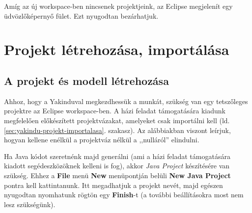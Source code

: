 \begin{comment}
Természetesen máshonnan is importálható projekt, illetve máshová is lehet menteni, de a workspace kényelmes megoldás arra, hogy egységes helyen tároljuk az aktuális munkáinkat.
\end{comment}

Amíg az új workspace-ben nincsenek projektjeink, az Eclipse megjelenít egy üdvözlőképernyő fület. Ezt nyugodtan bezárhatjuk.

\section{Projekt létrehozása, importálása}

\subsection{A projekt és modell létrehozása}
Ahhoz, hogy a Yakinduval megkezdhessük a munkát, szükség van egy tetszőleges projektre az Eclipse workspace-ben. A házi feladat támogatására kiadunk megfelelően előkészített projektvázakat, amelyeket csak importálni kell (ld. \ref{sec:yakindu-projekt-importalasa}. szakasz). Az alábbiakban viszont leírjuk, hogyan kellene enélkül a projektváz nélkül a ,,nulláról'' elindulni.

Ha Java kódot szeretnénk majd generálni (ami a házi feladat támogatására kiadott segédeszközöknek kelleni is fog), akkor \emph{Java Project} készítésére van szükség. Ehhez a \textbf{File} menü \textbf{New} menüpontján belüli \textbf{New Java Project} pontra kell kattintanunk. Itt megadhatjuk a projekt nevét, majd egészen nyugodtan nyomhatunk rögtön egy \textbf{Finish}-t (a további beállításokra most nem lesz szükségünk).

\begin{comment}
a további beállításokra még Szoftlab 3-on sem lesz szükségünk.
\end{comment}

\begin{comment}
\subsection{A projekten belüli Yakindu-mappa létrehozása -->}
\end{comment}

\begin{comment}
A bal oldali Project Explorerben láthatóak a projektjeink: itt keressük meg a frissen létrehozottat. A projekten belül célszerű lesz egy külön mappát létrehozni a modell számára Erre jobb gombbal kattintva \textbf{New} és \textbf{Folder}. A létrehozandó mappának adjuk a \emph{model} nevet. Ez persze bármi lehet, de most a modell nevet adjuk a mappának, hiszen a benne tárolt adat egy Yakinduban létrehozott állapotmodell lesz. A projektünkön belül létrejött egy \codeEsc{model} nevű mappa.
\subsection{A Yakindu állapotmodell létrehozása}
\end{comment}


